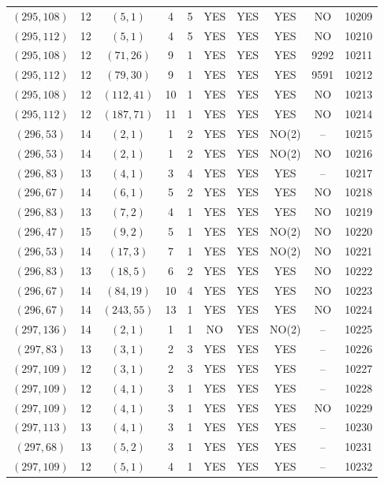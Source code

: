 \begin{longtable}{|c|c|c|c|c|c|c|c|c|c|}
$(295, 108)$ & 12 & $(5, 1)$ & 4 & 5 & YES & YES & YES & NO & 10209\\
$(295, 112)$ & 12 & $(5, 1)$ & 4 & 5 & YES & YES & YES & NO & 10210\\
$(295, 108)$ & 12 & $(71, 26)$ & 9 & 1 & YES & YES & YES & 9292 & 10211\\
$(295, 112)$ & 12 & $(79, 30)$ & 9 & 1 & YES & YES & YES & 9591 & 10212\\
$(295, 108)$ & 12 & $(112, 41)$ & 10 & 1 & YES & YES & YES & NO & 10213\\
$(295, 112)$ & 12 & $(187, 71)$ & 11 & 1 & YES & YES & YES & NO & 10214\\
$(296, 53)$ & 14 & $(2, 1)$ & 1 & 2 & YES & YES & NO(2) & -- & 10215\\
$(296, 53)$ & 14 & $(2, 1)$ & 1 & 2 & YES & YES & NO(2) & NO & 10216\\
$(296, 83)$ & 13 & $(4, 1)$ & 3 & 4 & YES & YES & YES & -- & 10217\\
$(296, 67)$ & 14 & $(6, 1)$ & 5 & 2 & YES & YES & YES & NO & 10218\\
$(296, 83)$ & 13 & $(7, 2)$ & 4 & 1 & YES & YES & YES & NO & 10219\\
$(296, 47)$ & 15 & $(9, 2)$ & 5 & 1 & YES & YES & NO(2) & NO & 10220\\
$(296, 53)$ & 14 & $(17, 3)$ & 7 & 1 & YES & YES & NO(2) & NO & 10221\\
$(296, 83)$ & 13 & $(18, 5)$ & 6 & 2 & YES & YES & YES & NO & 10222\\
$(296, 67)$ & 14 & $(84, 19)$ & 10 & 4 & YES & YES & YES & NO & 10223\\
$(296, 67)$ & 14 & $(243, 55)$ & 13 & 1 & YES & YES & YES & NO & 10224\\
$(297, 136)$ & 14 & $(2, 1)$ & 1 & 1 & NO & YES & NO(2) & -- & 10225\\
$(297, 83)$ & 13 & $(3, 1)$ & 2 & 3 & YES & YES & YES & -- & 10226\\
$(297, 109)$ & 12 & $(3, 1)$ & 2 & 3 & YES & YES & YES & -- & 10227\\
$(297, 109)$ & 12 & $(4, 1)$ & 3 & 1 & YES & YES & YES & -- & 10228\\
$(297, 109)$ & 12 & $(4, 1)$ & 3 & 1 & YES & YES & YES & NO & 10229\\
$(297, 113)$ & 13 & $(4, 1)$ & 3 & 1 & YES & YES & YES & -- & 10230\\
$(297, 68)$ & 13 & $(5, 2)$ & 3 & 1 & YES & YES & YES & -- & 10231\\
$(297, 109)$ & 12 & $(5, 1)$ & 4 & 1 & YES & YES & YES & -- & 10232\\

\end{longtable}
